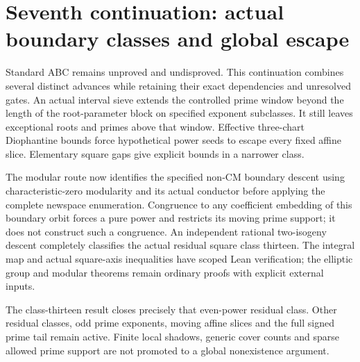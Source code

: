 \section{Seventh continuation: actual boundary classes and global escape}

Standard ABC remains unproved and undisproved. This continuation combines
several distinct advances while retaining their exact dependencies and
unresolved gates. An actual interval sieve extends the controlled prime
window beyond the length of the root-parameter block on specified exponent
subclasses. It still leaves exceptional roots and primes above that window.
Effective three-chart Diophantine bounds force hypothetical power seeds
to escape every fixed affine slice. Elementary square gaps give explicit
bounds in a narrower class.

The modular route now identifies the specified non-CM boundary descent
using characteristic-zero modularity and its actual conductor before
applying the complete newspace enumeration. Congruence to any coefficient
embedding of this boundary orbit forces a pure power and restricts its
moving prime support; it does not construct such a congruence. An independent
rational two-isogeny descent completely classifies the actual residual
square class thirteen. The integral map and actual square-axis inequalities
have scoped Lean verification; the elliptic group and modular theorems
remain ordinary proofs with explicit external inputs.

The class-thirteen result closes precisely that even-power residual class.
Other residual classes, odd prime exponents, moving affine slices and the
full signed prime tail remain active. Finite local shadows, generic cover
counts and sparse allowed prime support are not promoted to a global
nonexistence argument.
